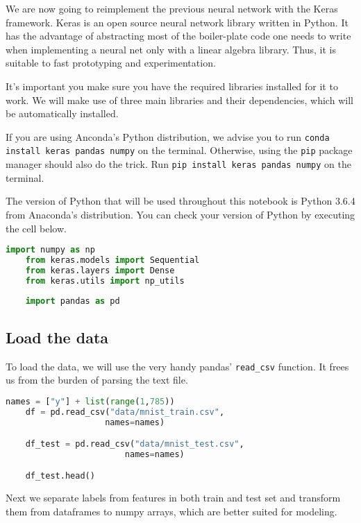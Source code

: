 We are now going to reimplement the previous neural network with the Keras framework. Keras is an open source neural network library written in Python. It has the advantage of abstracting most of the boiler-plate code one needs to write when implementing a neural net only with a linear algebra library. Thus, it is suitable to fast prototyping and experimentation.

It's important you make sure you have the required libraries installed for it to work. We will make use of three main libraries and their dependencies, which will be automatically installed.

If you are using Anconda's Python distribution, we advise you to run \lstinline{conda install keras pandas numpy} on the terminal. 
Otherwise, using the \lstinline{pip} package manager should also do the trick.
Run \lstinline{pip install keras pandas numpy} on the terminal.

The version of Python that will be used throughout this notebook is Python 3.6.4 from Anaconda's distribution. You can check your version of Python by executing the cell below.

\begin{lstlisting}[language=Python]
    import numpy as np
    from keras.models import Sequential
    from keras.layers import Dense
    from keras.utils import np_utils
    
    import pandas as pd
\end{lstlisting}

\subsection{Load the data}

To load the data, we will use the very handy pandas' \lstinline{read_csv} function. It frees us from the burden of parsing the text file.

\begin{lstlisting}[language=Python]
    names = ["y"] + list(range(1,785))
    df = pd.read_csv("data/mnist_train.csv", 
                    names=names)

    df_test = pd.read_csv("data/mnist_test.csv", 
                        names=names)

    df_test.head()
\end{lstlisting}

Next we separate labels from features in both train and test set and transform them from dataframes to numpy arrays, which are better suited for modeling.

